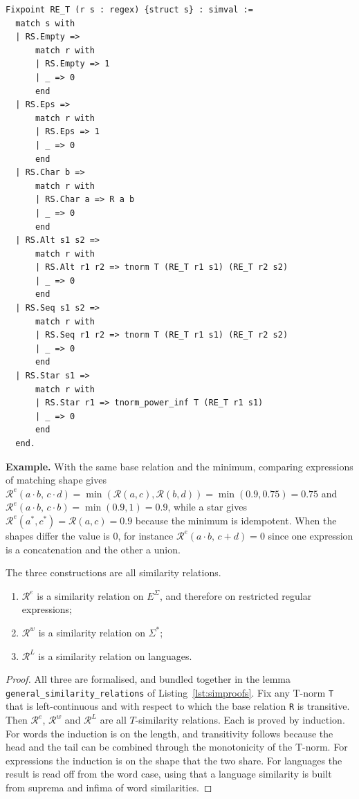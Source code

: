 \begin{lstlisting}[style=rocqstyle,caption={Syntactic similarity on expressions, general T-norm (\texttt{SimilarityRelations.v}).},label={lst:rr}]
Fixpoint RE_T (r s : regex) {struct s} : simval :=
  match s with
  | RS.Empty =>
      match r with
      | RS.Empty => 1
      | _ => 0
      end
  | RS.Eps =>
      match r with
      | RS.Eps => 1
      | _ => 0
      end
  | RS.Char b =>
      match r with
      | RS.Char a => R a b
      | _ => 0
      end
  | RS.Alt s1 s2 =>
      match r with
      | RS.Alt r1 r2 => tnorm T (RE_T r1 s1) (RE_T r2 s2)
      | _ => 0
      end
  | RS.Seq s1 s2 =>
      match r with
      | RS.Seq r1 r2 => tnorm T (RE_T r1 s1) (RE_T r2 s2)
      | _ => 0
      end
  | RS.Star s1 =>
      match r with
      | RS.Star r1 => tnorm_power_inf T (RE_T r1 s1)
      | _ => 0
      end
  end.
\end{lstlisting}

\noindent\textbf{Example.} With the same base relation and the minimum, comparing
expressions of matching shape gives
$\mathcal{R}^{e}(a\cdot b,\,c\cdot d)=\min(\mathcal{R}(a,c),\mathcal{R}(b,d))=\min(0.9,0.75)=0.75$
and $\mathcal{R}^{e}(a\cdot b,\,c\cdot b)=\min(0.9,1)=0.9$, while a star gives
$\mathcal{R}^{e}(a^{*},c^{*})=\mathcal{R}(a,c)=0.9$ because the minimum is
idempotent. When the shapes differ the value is $0$, for instance
$\mathcal{R}^{e}(a\cdot b,\,c+d)=0$ since one expression is a concatenation and the
other a union.

\medskip
The three constructions are all similarity relations.

\begin{lemma}\label{lem:sim-relations}\mbox{}
\begin{enumerate}
\item $\mathcal{R}^{e}$ is a similarity relation on $E^{\Sigma}$, and therefore on
restricted regular expressions;
\item $\mathcal{R}^{w}$ is a similarity relation on $\Sigma^{*}$;
\item $\mathcal{R}^{L}$ is a similarity relation on languages.
\end{enumerate}
\end{lemma}

\begin{proof}
All three are formalised, and bundled together in the lemma
\texttt{general\_\allowbreak similarity\_\allowbreak relations} of
Listing~\ref{lst:simproofs}. Fix any
T-norm \texttt{T} that is left-continuous and with respect to which the base
relation \texttt{R} is transitive. Then $\mathcal{R}^{e}$, $\mathcal{R}^{w}$ and
$\mathcal{R}^{L}$ are all $T$-similarity relations. Each is proved by induction.
For words the induction is on the length, and transitivity follows because the
head and the tail can be combined through the monotonicity of the T-norm. For
expressions the induction is on the shape that the two share. For languages the
result is read off from the word case, using that a language similarity is built
from suprema and infima of word similarities.
\end{proof}

